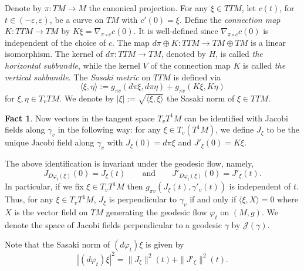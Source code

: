 \documentclass[10pt]{amsart}
\theoremstyle{definition}
\newtheorem{fact}[theorem]{Fact}
\let\phi\varphi
\let\eps\varepsilon
\renewcommand{\>}{{\rangle}}
\newcommand{\<}{{\langle}}
\begin{document}
Denote by $\pi: TM\to M$ the canonical projection. For any $\xi\in TTM$, let $c(t)$, for $t\in(-\eps,\eps)$, be a curve on $TM$ with $c'(0)=\xi$. Define the {\it connection map $K: TTM\to TM$} by $K\xi=\nabla_{\pi\circ c}c(0)$. It is well-defined since $\nabla_{\pi\circ c}c(0)$ is independent of the choice of $c$. The map $d\pi\oplus K: TTM\to TM\oplus TM$ is a linear isomorphism. The kernel of $d\pi: TTM\to TM$, denoted by $H$, is called {\it the horizontal subbundle}, while the kernel $V$ of the connection map $K$ is called {\it the vertical subbundle}. The {\it Sasaki metric} on $TTM$ is defined via
\[
\langle \xi, \eta\rangle:=g_{\pi v} (d\pi \xi, d\pi\eta)+g_{\pi v} (K\xi, K\eta)
\]
for $\xi,\eta\in T_vTM$. We denote by $|\xi|:=\sqrt{\langle \xi, \xi\rangle}$ the Sasaki norm of $\xi\in TTM$.

\begin{fact}\label{identification_Jacobi}
Now vectors in the tangent space $T_vT^1M$ can be identified with Jacobi fields along $\gamma_v$ in the following way: for any $\xi\in T_v(T^1M)$, we define $J_{\xi}$ to be the unique Jacobi field along $\gamma_v$ with $J_{\xi}(0)=d\pi\xi$ and $J'_{\xi}(0)=K\xi$.
\end{fact}

The above identification is invariant under the geodesic flow, namely,
\begin{equation*}
J_{D\phi_t(\xi)}(0)=J_{\xi}(t)\qquad \text{and} \qquad J'_{D\phi_t(\xi)}(0)=J'_{\xi}(t).
\end{equation*}
In particular, if we fix $\xi\in T_vT^1M$ then $g_{\pi v} (J_{\xi}(t), \gamma'_v(t))$ is independent of $t$. Thus, for any $\xi\in T_vT^1M$, $J_{\xi}$ is perpendicular to $\gamma_v$ if and only if $\langle\xi, X\rangle=0$ where $X$ is the vector field on $TM$ generating the geodesic flow $\phi_t$ on $(M,g)$. We denote the space of Jacobi fields perpendicular to a geodesic $\gamma$ by $\mathcal J(\gamma)$.

Note that the Sasaki norm of $(d\phi_t)\xi$ is given by
\begin{equation}\label{eq: sasaki_jacobi}
|(d\phi_t)\xi|^2=\|J_{\xi}\|^2(t)+\|J'_{\xi}\|^2(t).
\end{equation}
\end{document}
